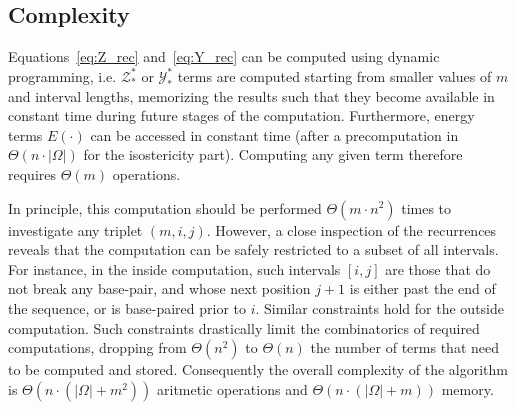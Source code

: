 \subsection{Complexity}
Equations~\eqref{eq:Z_rec} and~\eqref{eq:Y_rec} can be computed using dynamic programming, i.e. $\mathcal{Z}^{*}_{*}$ or $\mathcal{Y}^{*}_{*}$ terms are computed starting from smaller values of $m$ and interval lengths, memorizing the results such that they become available in constant time during future stages of the computation. Furthermore, energy terms $E(\cdot)$ can be accessed in constant time (after a precomputation in $\Theta(n\cdot|\Omega|)$ for the isostericity part). Computing any given term therefore requires $\Theta(m)$ operations.

In principle, this computation should be performed $\Theta(m\cdot n^2)$ times to investigate any triplet $(m,i,j)$.
However, a close inspection of the recurrences reveals that the computation can be safely restricted to a subset of all intervals.
For instance, in the inside computation, such intervals $[i,j]$ are those that do not break any base-pair, and whose next position $j+1$ is either past the end of the sequence, or is base-paired prior to $i$. Similar constraints hold for the outside computation. Such constraints drastically limit the combinatorics of required computations, dropping from $\Theta(n^2)$ to $\Theta(n)$ the number of terms that need to be computed and stored. Consequently the overall complexity of the algorithm is $\Theta(n\cdot(|\Omega|+m^2))$ aritmetic operations and $\Theta(n\cdot(|\Omega|+m))$ memory.
